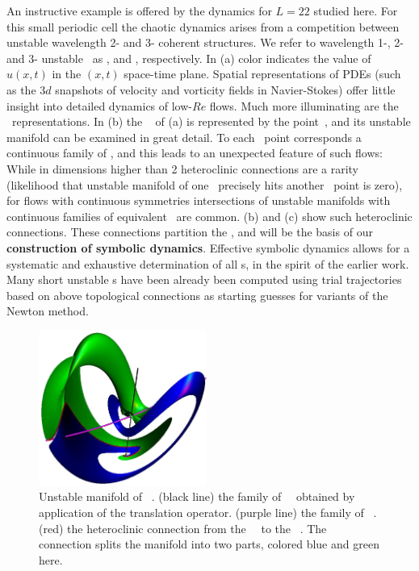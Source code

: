 An instructive 
example is offered by the dynamics for $L=22$ studied here.
For this small periodic cell
the chaotic dynamics arises from
a competition between unstable
wavelength 2- and 3- coherent structures.
We refer to wavelength 1-, 2- and 3- unstable \eqva\ as
,  and ,
respectively.
In (a)
color indicates the value of $u(x,t)$ in 
the $(x,t)$ space-time plane.
Spatial representations of
PDEs (such as the 3$d$
snapshots of velocity and vorticity fields in Navier-Stokes)
offer little insight into detailed dynamics of low-$Re$ flows.
Much more illuminating are the \statesp\ representations.
In (b) the \eqv~ of
(a) is represented by the point~,
and its unstable manifold can be examined in great detail.
To each \eqv\ point corresponds a continuous family
of \eqva, and this leads to an unexpected feature of such
flows: While in dimensions higher than 2 heteroclinic connections 
are a rarity (likelihood that unstable manifold of one
 \eqv\ precisely hits another \eqv\ point is zero), 
for flows with continuous symmetries intersections of unstable
manifolds with continuous families of equivalent \eqva\ are common.
(b) and (c) show 
such heteroclinic connections.
These connections partition the \statesp,
and will be the basis of our
{\bf construction of symbolic dynamics}.
Effective symbolic dynamics allows
for a systematic and exhaustive determination 
of all \rpo s, in the spirit of 
the earlier work. 
Many short unstable \rpo s have been already 
been computed using trial trajectories based on above
topological connections as starting  guesses 
for variants of the Newton method.


\begin{figure}[t]
\begin{center} 
\includegraphics[height=2in]{figs/ks22manifold1.eps}
\end{center}
\caption{
    Unstable manifold of ~\eqv.
    (black line) the family of ~\eqva\ 
obtained by application of the translation operator. 
(purple line) the family of ~\eqva.
(red) the heteroclinic connection 
from the ~\eqv\ to the ~\eqv.
The connection splits the manifold into two parts, 
colored blue and green here.
        }
\label{f:KS22Manifold}\vspace*{-5pt}
\end{figure}


